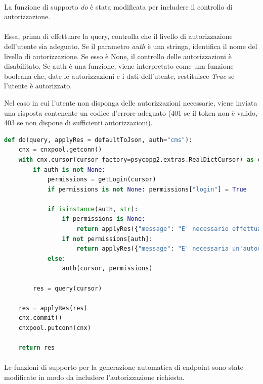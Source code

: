 \documentclass[11pt,a4paper,english]{article}
\begin{document}
\paragraph{} La funzione di supporto \emph{do} è stata modificata per includere il controllo di autorizzazione. 

\paragraph{} Essa, prima di effettuare la query, controlla che il livello di autorizzazione dell'utente sia adeguato. Se il parametro \emph{auth} è una stringa, identifica il nome del livello di autorizzazione. Se esso è None, il controllo delle autorizzazioni è disabilitato. Se auth è una funzione, viene interpretato come una funzione booleana che, date le autorizzazioni e i dati dell'utente, restituisce \emph{True} se l'utente è autorizzato. 

\emph{} Nel caso in cui l'utente non disponga delle autorizzazioni necessarie, viene inviata una risposta contenente un codice d'errore adeguato (401 se il token non è valido, 403 se non dispone di sufficienti autorizzazioni).

\begin{lstlisting}[language=Python, caption=Funzione ausiliaria do modificata]
def do(query, applyRes = defaultToJson, auth="cms"):
    cnx = cnxpool.getconn()
    with cnx.cursor(cursor_factory=psycopg2.extras.RealDictCursor) as cursor:
        if auth is not None:
            permissions = getLogin(cursor)
            if permissions is not None: permissions["login"] = True

            if isinstance(auth, str):
                if permissions is None:
                    return applyRes({"message": "E' necessario effettuare il login"}, 401)
                if not permissions[auth]:
                    return applyRes({"message": "E' necessaria un'autorizzazione di tipo " + auth}, 403)
            else:
                auth(cursor, permissions)

        res = query(cursor)

    res = applyRes(res)
    cnx.commit()
    cnxpool.putconn(cnx)

    return res
\end{lstlisting}

\paragraph{} Le funzioni di supporto per la generazione automatica di endpoint sono state modificate in modo da includere l'autorizzazione richiesta. 
\end{document}
